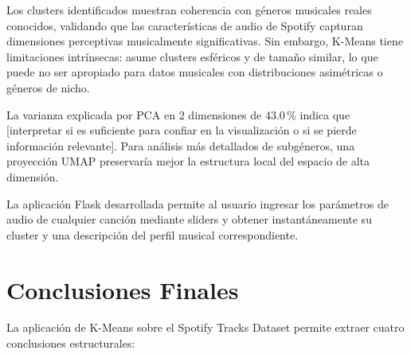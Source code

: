 \documentclass[12pt, a4paper]{article}
\begin{document}
Los clusters identificados muestran coherencia con géneros musicales reales
conocidos, validando que las características de audio de Spotify capturan
dimensiones perceptivas musicalmente significativas. Sin embargo, K-Means
tiene limitaciones intrínsecas: asume clusters esféricos y de tamaño
similar, lo que puede no ser apropiado para datos musicales con distribuciones
asimétricas o géneros de nicho.

La varianza explicada por PCA en 2 dimensiones de 43.0\,\% indica
que [interpretar si es suficiente para confiar en la visualización o si
se pierde información relevante]. Para análisis más detallados de
subgéneros, una proyección UMAP preservaría mejor la estructura local del
espacio de alta dimensión.

La aplicación Flask desarrollada permite al usuario ingresar los parámetros
de audio de cualquier canción mediante sliders y obtener instantáneamente
su cluster y una descripción del perfil musical correspondiente.

\section{Conclusiones Finales}

La aplicación de K-Means sobre el Spotify Tracks Dataset permite extraer
cuatro conclusiones estructurales:
\end{document}
